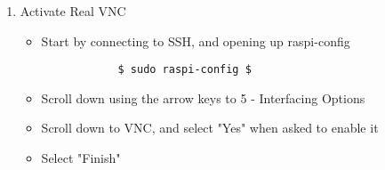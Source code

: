 \begin{enumerate}
    \item Activate Real VNC\\
        \begin{itemize}
            \item Start by connecting to SSH, and opening up raspi-config
        \begin{verbatim}
            $ sudo raspi-config $
        \end{verbatim}
        \item Scroll down using the arrow keys to 5 - Interfacing Options
        \item Scroll down to VNC, and select "Yes" when asked to enable it
        \item Select "Finish"
    \end{itemize}
    

\end{enumerate}

